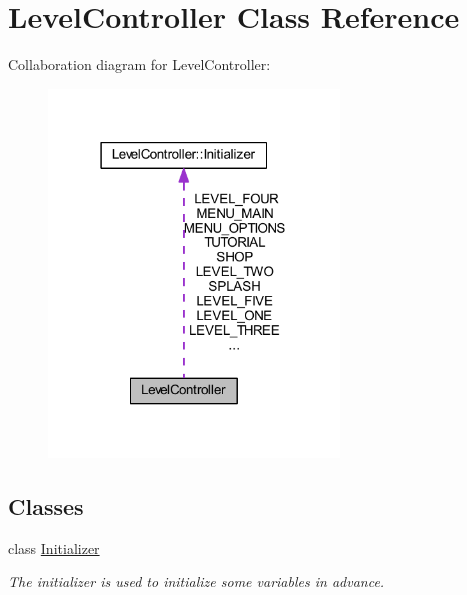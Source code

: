 \hypertarget{class_level_controller}{\section{Level\+Controller Class Reference}
\label{class_level_controller}
}


Collaboration diagram for Level\+Controller\+:
\nopagebreak
\begin{figure}[H]
\begin{center}
\leavevmode
\includegraphics[width=219pt]{class_level_controller__coll__graph}
\end{center}
\end{figure}
\subsection*{Classes}
\begin{DoxyCompactItemize}
\item 
class \hyperlink{class_level_controller_1_1_initializer}{Initializer}
\begin{DoxyCompactList}\small\item\em The initializer is used to initialize some variables in advance. \end{DoxyCompactList}\end{DoxyCompactItemize}

